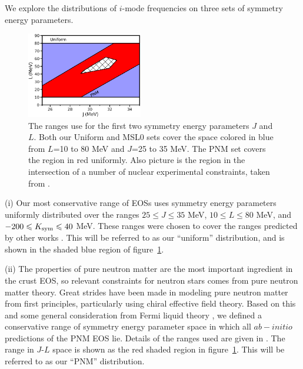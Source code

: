 \documentclass[fleqn,usenatbib]{mnras}
\begin{document}
We explore the distributions of $i$-mode frequencies on three sets of symmetry energy parameters.

\begin{figure}
\centering
\includegraphics[width=0.45\textwidth,angle=0]{JLsim-Ranges_v2.png}
\caption{The ranges use for the first two symmetry energy parameters $J$ and $L$. Both our Uniform and MSL0 sets cover the space colored in blue from $L$=10 to 80 MeV and $J$=25 to 35 MeV. The PNM set covers the region in red uniformly. Also picture is the region in the intersection of a number of nuclear experimental constraints, taken from \citet{lattimer2013constraining}.}
\label{fig:JLRanges}
\end{figure}

(i) Our most conservative range of EOSs uses symmetry energy parameters uniformly distributed over the ranges $25\leq J\leq 35$ MeV, $10\leq L\leq 80$ MeV, and $-200\leq K_{\rm sym}\leq 40$ MeV. These ranges were chosen to cover the ranges predicted by other works \citep{liu2010nuclear,tsang2012constraints,lattimer2013constraining}. This will be referred to as our ``uniform'' distribution, and is shown in the shaded blue region of figure~\ref{fig:JLRanges}.

(ii) The properties of pure neutron matter are the most important ingredient in the crust EOS, so relevant constraints for neutron stars comes from pure neutron matter theory. Great strides have been made in modeling pure neutron matter from first principles, particularly using chiral effective field theory. Based on this and some general consideration from Fermi liquid theory \citep{holt2018universal}, we defined a conservative range of symmetry energy parameter space in which all $ab-initio$ predictions of the PNM EOS lie. Details of the ranges used are given in \citet{newton2020nuclear}. The range in $J$-$L$ space is shown as the red shaded region in figure~\ref{fig:JLRanges}. This will be referred to as our ``PNM'' distribution.
\end{document}
